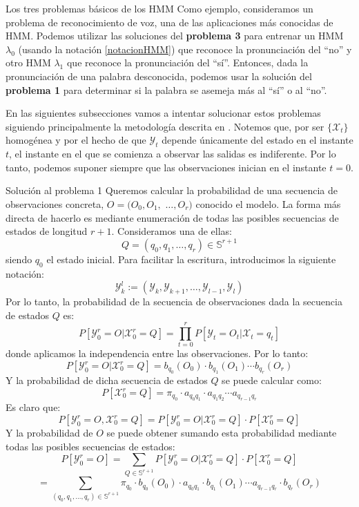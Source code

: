 \begin{section}{Los tres problemas básicos de los HMM}
Como ejemplo, consideramos un problema de reconocimiento de voz, una de las aplicaciones más conocidas de HMM. Podemos utilizar las soluciones del \textbf{problema 3} para entrenar un HMM $\lambda_0$ (usando la notación \eqref{notacionHMM}) que reconoce la pronunciación del \enquote{no} y otro HMM $\lambda_1$ que reconoce la pronunciación del \enquote{sí}. Entonces, dada la pronunciación de una palabra desconocida, podemos usar la solución del \textbf{problema 1} para determinar si la palabra se asemeja más al \enquote{sí} o al \enquote{no}.  

En las siguientes subsecciones vamos a intentar solucionar estos problemas siguiendo principalmente la metodología descrita en \cite{Rabiner}. Notemos que, por ser $\{\mathcal{X}_t\}$ homogénea y por el hecho de que $\mathcal{Y}_t$ depende únicamente del estado en el instante $t$, el instante en el que se comienza a observar las salidas es indiferente. Por lo tanto, podemos suponer siempre que las observaciones inician en el instante $t=0$.

\begin{subsection}{Solución al problema 1}
Queremos calcular la probabilidad de una secuencia de observaciones concreta, $O=(O_0,O_1,$ $\dots, O_r)$ conocido el modelo. La forma más directa de hacerlo es mediante enumeración de todas las posibles secuencias de estados de longitud $r+1$. Consideramos una de ellas:
\[Q=(q_0 , q_1 , \dots , q_r)\in\mathbb{S}^{r+1}\]
siendo $q_0$ el estado inicial. Para facilitar la escritura, introducimos la siguiente notación:
\[\mathcal{Y}_k^l:=(\mathcal{Y}_{k},\mathcal{Y}_{k+1},\dots,\mathcal{Y}_{l-1},\mathcal{Y}_{l})\]
Por lo tanto, la probabilidad de la secuencia de observaciones dada la secuencia de estados $Q$ es:
\[P[\mathcal{Y}_0^r=O|\mathcal{X}_0^r=Q]=\prod_{t=0}^r P[\mathcal{Y}_{t}=O_t|\mathcal{X}_{t}=q_t]\]
donde aplicamos la independencia entre las observaciones. Por lo tanto:
\[P[\mathcal{Y}_0^r=O|\mathcal{X}_0^r=Q]=b_{q_0}(O_0)\cdot b_{q_1}(O_1)\cdots b_{q_r}(O_r)\]
Y la probabilidad de dicha secuencia de estados $Q$ se puede calcular como:
\[P[\mathcal{X}_0^r=Q]=\pi_{q_0}\cdot a_{q_0q_1}\cdot a_{q_1q_2}\cdots a_{q_{r-1}q_r} \]
Es claro que:
\[P[\mathcal{Y}_0^r=O,\mathcal{X}_0^r=Q]=P[\mathcal{Y}_0^r=O|\mathcal{X}_0^r=Q]\cdot P[\mathcal{X}_0^r=Q] \]
Y la probabilidad de $O$ se puede obtener sumando esta probabilidad mediante todas las posibles secuencias de estados:
\[P[\mathcal{Y}_0^r=O]=\sum_{Q\in\mathbb{S}^{r+1}}P[\mathcal{Y}_0^r=O|\mathcal{X}_0^r=Q]\cdot P[\mathcal{X}_0^r=Q]\]
\[=\sum_{(q_0 , q_1 , \dots , q_r)\in\mathbb{S}^{r+1}}\pi_{q_0}\cdot b_{q_0}(O_0)\cdot a_{q_0q_1}\cdot b_{q_1}(O_1)\cdots a_{q_{r-1}q_r}\cdot b_{q_r}(O_r)\]


\end{subsection}
\end{section}
